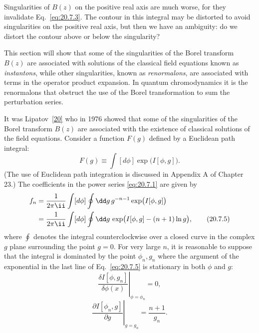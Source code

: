 Singularities of $B(z)$ on the positive real axis are much worse, for they invalidate Eq.~\eqref{eq:20.7.3}. The contour in this integral may be distorted to avoid singularities on the positive real axis, but then we have an ambiguity: do we distort the contour above or below the singularity?

This section will show that some of the singularities of the Borel transform $B(z)$ are associated with solutions of the classical field equations known as \emph{instantons}, while other singularities, known as \emph{renormalons}, are associated with terms in the operator product expansion. In quantum chromodynamics it is the renormalons that obstruct the use of the Borel transformation to sum the perturbation series.

It was Lipatov~\hyperref[ch20-ref-20]{[20]} who in 1976 showed that some of the singularities of the Borel transform $B(z)$ are associated with the existence of classical solutions of the field equations. Consider a function $F(g)$ defined by a Euclidean path integral:
\begin{equation}
F(g)\equiv\int[d\phi]\exp\bigl(I[\phi,g]\bigr).
\tag{20.7.4}\label{eq:20.7.4}
\end{equation}
(The use of Euclidean path integration is discussed in Appendix A of Chapter 23.) The coefficients in the power series \eqref{eq:20.7.1} are given by
\begin{align}
f_n
&=\frac{1}{2\pi \ii}\int[d\phi]\oint \dd g\,g^{-n-1}
\exp\bigl(I[\phi,g]\bigr)
\notag\\
&=\frac{1}{2\pi \ii}\int[d\phi]\oint \dd g\,
\exp\bigl(I[\phi,g]-(n+1)\ln g\bigr),
\tag{20.7.5}\label{eq:20.7.5}
\end{align}
where $\oint$ denotes the integral counterclockwise over a closed curve in the complex $g$ plane surrounding the point $g=0$. For very large $n$, it is reasonable to suppose that the integral is dominated by the point $\phi_n,g_n$ where the argument of the exponential in the last line of Eq.~\eqref{eq:20.7.5} is stationary in both $\phi$ and $g$:
\begin{equation}
\left.
\frac{\delta I[\phi,g_n]}{\delta\phi(x)}
\right|_{\phi=\phi_n}
=0,
\tag{20.7.6}\label{eq:20.7.6}
\end{equation}
\begin{equation}
\left.
\frac{\partial I[\phi_n,g]}{\partial g}
\right|_{g=g_n}
=\frac{n+1}{g_n}.
\tag{20.7.7}\label{eq:20.7.7}
\end{equation}

